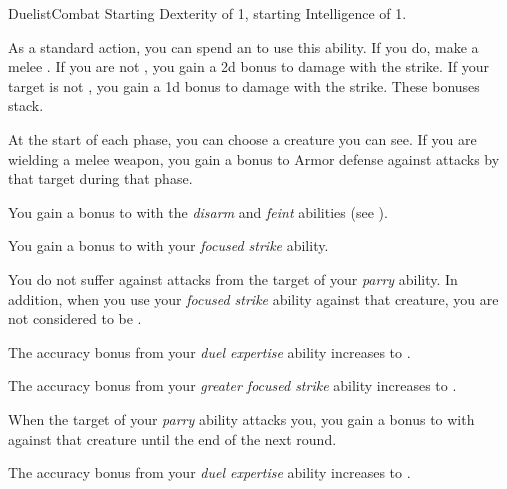     \begin{feat}{Duelist}{Combat}
        \featpre Starting Dexterity of 1, starting Intelligence of 1.
        \featben

         As a standard action, you can spend an  to use this ability.
        If you do, make a melee .
        If you are not , you gain a \plus2d bonus to damage with the strike.
        If your target is not , you gain a \plus1d bonus to damage with the strike.
        These bonuses stack.

         At the start of each phase, you can choose a creature you can see.
        If you are wielding a melee weapon, you gain a  bonus to Armor defense against attacks by that target during that phase.

         You gain a  bonus to  with the \textit{disarm} and \textit{feint} abilities (see ).

         You gain a  bonus to  with your \textit{focused strike} ability.

         You do not suffer  against attacks from the target of your \textit{parry} ability.
        In addition, when you use your \textit{focused strike} ability against that creature, you are not considered to be .

         The accuracy bonus from your \textit{duel expertise} ability increases to . 

         The accuracy bonus from your \textit{greater focused strike} ability increases to .

         When the target of your \textit{parry} ability attacks you, you gain a  bonus to  with  against that creature until the end of the next round.

         The accuracy bonus from your \textit{duel expertise} ability increases to . 

        \ff[18]{}
    \end{feat}

